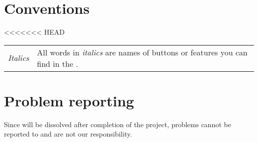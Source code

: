 \section{Conventions}
<<<<<<< HEAD
\begin{tabular}{lp{14cm}}
\emph{Italics} & All words in \emph{italics} are names of buttons or features you can find in the \applicationname{}.\\
\end{tabular}

\section{Problem reporting}
Since \projectauthor{} will be dissolved after completion of the \projectname{} project, problems cannot be reported to \projectauthor{} and are not our responsibility.